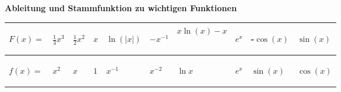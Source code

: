 \textbf{Ableitung und Stammfunktion zu wichtigen Funktionen}\\
\begin{tabular} { | p{} | p{} | p{} | p{} |p{} | p{} |p{} | p{} |p{} | p{} |}
     \hline
     \begin{center} $F(x) =$ \end{center} & \begin{center} $\frac{1}{3}x^3$ \end{center} & \begin{center} $\frac{1}{2}x^2$ \end{center} & \begin{center} $x$ \end{center} & \begin{center}  $\ln{(|x|)}$ \end{center} & \begin{center} $-x^{-1}$ \end{center} &  \vspace{3pt}\centering$x\ln{(x)} -x$  & \begin{center} $e^x$ \end{center} & \begin{center} -$\cos{(x)}$ \end{center} & \begin{center} $\sin{(x)}$  \end{center}  \\
     \hline
     \begin{center} $f(x) =$ \end{center} & \begin{center} $x^2$ \end{center} & \begin{center} $x$ \end{center} & \begin{center} $1$ \end{center} & \begin{center}  $x^{-1}$ \end{center} & \begin{center} $x^{-2}$ \end{center} & \begin{center} $\ln{x}$ \end{center} & \begin{center} $e^x$ \end{center} & \begin{center} $\sin{(x)}$ \end{center} & \begin{center} $\cos{(x)}$  \end{center}  \\

\end{tabular}
